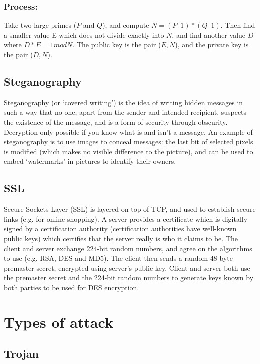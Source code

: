 \documentclass[a4paper,oneside]{report}
\begin{document}
    	\subsubsection{Process:} Take two large primes ($P$ and $Q$), and compute $N = (P – 1) * (Q – 1)$. Then find a smaller value E which does not divide exactly into $N$, and find another value $D$ where $D * E = 1 mod N$. The public key is the pair ($E,N$), and the private key is the pair ($D,N$).
    	
    	\subsection{Steganography}
    	
    	Steganography (or `covered writing') is the idea of writing hidden messages in such a way that no one, apart from the sender and intended recipient, suspects the existence of the message, and is a form of security through obscurity. Decryption only possible if you know what is and isn’t a message. An example of steganography is to use images to conceal messages: the last bit of selected pixels is modified (which makes no visible difference to the picture), and can be used to embed `watermarks' in pictures to identify their owners.
    	
    	\subsection{SSL}
    	
    	Secure Sockets Layer (SSL) is layered on top of TCP, and used to establish secure links (e.g. for  online shopping). A server provides a certificate which is digitally signed by a certification authority (certification authorities have well-known public keys) which certifies that the server really is who it claims to be. The client and server exchange 224-bit random numbers, and agree on the algorithms to use (e.g. RSA, DES and MD5). The client then sends a random 48-byte premaster secret, encrypted using server’s public key. Client and server both use the premaster secret and the 224-bit random numbers to generate keys known by both parties to be used for DES encryption.
    	
  	\section{Types of attack}
    	\subsection{Trojan}
\end{document}
